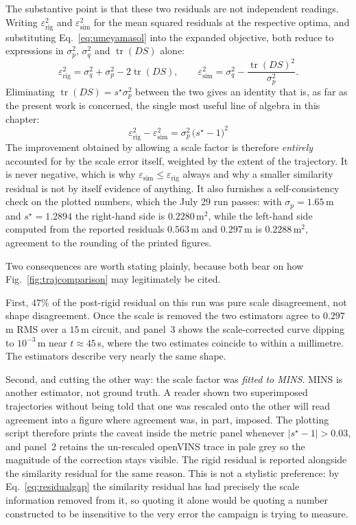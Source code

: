 The substantive point is that these two residuals are not independent
readings. Writing $\varepsilon^{2}_{\text{rig}}$ and
$\varepsilon^{2}_{\text{sim}}$ for the mean squared residuals at the
respective optima, and substituting Eq.~\ref{eq:umeyamasol} into the
expanded objective, both reduce to expressions in $\sigma_p^2$, $\sigma_q^2$
and $\operatorname{tr}(DS)$ alone:
\begin{equation}
\varepsilon^{2}_{\text{rig}}=\sigma_q^{2}+\sigma_p^{2}-2\operatorname{tr}(DS),
\qquad
\varepsilon^{2}_{\text{sim}}=\sigma_q^{2}-\frac{\operatorname{tr}(DS)^{2}}{\sigma_p^{2}} .
\label{eq:residuals}
\end{equation}
Eliminating $\operatorname{tr}(DS)=s^{\star}\sigma_p^{2}$ between the two
gives an identity that is, as far as the present work is concerned, the
single most useful line of algebra in this chapter:
\begin{equation}
\boxed{\;\varepsilon^{2}_{\text{rig}}-\varepsilon^{2}_{\text{sim}}
      =\sigma_p^{2}\,\bigl(s^{\star}-1\bigr)^{2}\;}
\label{eq:residualgap}
\end{equation}
The improvement obtained by allowing a scale factor is therefore
\emph{entirely} accounted for by the scale error itself, weighted by the
extent of the trajectory. It is never negative, which is why
$\varepsilon_{\text{sim}}\le\varepsilon_{\text{rig}}$ always and why a
smaller similarity residual is not by itself evidence of anything. It also
furnishes a self-consistency check on the plotted numbers, which the July 29
run passes: with $\sigma_p=1.65$\,m and $s^{\star}=1.2894$ the right-hand
side is $0.2280$\,m$^2$, while the left-hand side computed from the reported
residuals $0.563$\,m and $0.297$\,m is $0.2288$\,m$^2$, agreement to the
rounding of the printed figures.

Two consequences are worth stating plainly, because both bear on how
Fig.~\ref{fig:trajcomparison} may legitimately be cited.

First, $47\%$ of the post-rigid residual on this run was pure scale
disagreement, not shape disagreement. Once the scale is removed the two
estimators agree to $0.297$\,m RMS over a $15$\,m circuit, and panel~3 shows
the scale-corrected curve dipping to $10^{-3}$\,m near $t\approx45$\,s,
where the two estimates coincide to within a millimetre. The estimators
describe very nearly the same shape.

Second, and cutting the other way: the scale factor was \emph{fitted to
MINS}. MINS is another estimator, not ground truth. A reader shown two
superimposed trajectories without being told that one was rescaled onto the
other will read agreement into a figure where agreement was, in part,
imposed. The plotting script therefore prints the caveat inside the metric
panel whenever $\lvert s^{\star}-1\rvert>0.03$, and panel~2 retains the
un-rescaled openVINS trace in pale grey so the magnitude of the correction
stays visible. The rigid residual is reported alongside the similarity
residual for the same reason. This is not a stylistic preference: by
Eq.~\ref{eq:residualgap} the similarity residual has had precisely the scale
information removed from it, so quoting it alone would be quoting a number
constructed to be insensitive to the very error the campaign is trying to
measure.

